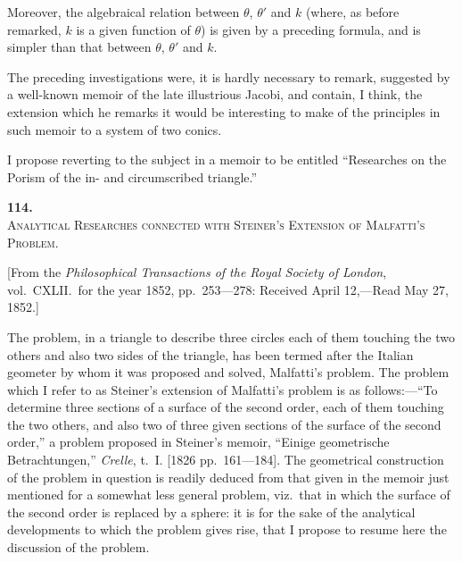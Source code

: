 \documentclass[11pt,a4paper]{book}
\begin{document}
Moreover, the algebraical relation between $\theta$, $\theta'$ and $k$ (where, as before remarked, $k$ is a given function of $\theta$) is given by a preceding formula, and is simpler than that between $\theta$, $\theta'$ and $k$.

The preceding investigations were, it is hardly necessary to remark, suggested by a well-known memoir of the late illustrious Jacobi, and contain, I think, the extension which he remarks it would be interesting to make of the principles in such memoir to a system of two conics.

I propose reverting to the subject in a memoir to be entitled ``Researches on the Porism of the in- and circumscribed triangle.''

\begin{flushright}
\end{flushright}


\newpage
\setcounter{page}{57}

\begin{center}
{\Large\bfseries 114.}\\[0.5em]
{\large\scshape Analytical Researches connected with Steiner's Extension of Malfatti's Problem.}
\end{center}
\vspace{0.3em}
\begin{center}
\small [From the \textit{Philosophical Transactions of the Royal Society of London}, vol.~CXLII.\ for the year 1852, pp.~253---278: Received April 12,---Read May 27, 1852.]
\end{center}
\vspace{0.5em}

The problem, in a triangle to describe three circles each of them touching the two others and also two sides of the triangle, has been termed after the Italian geometer by whom it was proposed and solved, Malfatti's problem. The problem which I refer to as Steiner's extension of Malfatti's problem is as follows:---``To determine three sections of a surface of the second order, each of them touching the two others, and also two of three given sections of the surface of the second order,'' a problem proposed in Steiner's memoir, ``Einige geometrische Betrachtungen,'' \textit{Crelle}, t.~I. [1826 pp.~161---184]. The geometrical construction of the problem in question is readily deduced from that given in the memoir just mentioned for a somewhat less general problem, viz.\ that in which the surface of the second order is replaced by a sphere: it is for the sake of the analytical developments to which the problem gives rise, that I propose to resume here the discussion of the problem.
\end{document}
